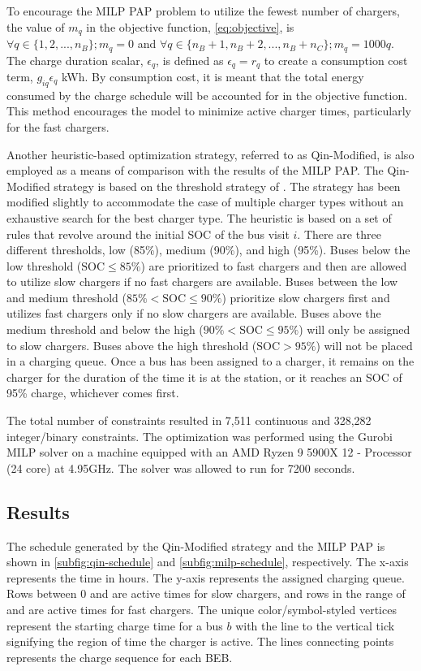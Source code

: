 \documentclass[utf8]{FrontiersinHarvard}
\let\cite\citep                                       %
\newcommand{\fast}{15 }                                                         %
\newcommand{\slow}{15 }                                                         %
\newcommand{\contvars}{7,511 }
\newcommand{\intvars}{328,282 }
\newcommand{\timeran}{7200 }                                                    %
\begin{document}
To encourage the MILP PAP problem to utilize the fewest number of chargers, the value of \(m_q\) in the objective
function, \autoref{eq:objective}, is \(\forall q \in \{1,2,..., n_B \}; m_q = 0\) and \(\forall q \in \{n_B + 1, n_B + 2,..., n_B + n_C \};
m_q = 1000q\). The charge duration scalar, \(\epsilon_q\), is defined as \(\epsilon_q = r_q\) to create a consumption cost term,
\(g_{iq}\epsilon_q\) kWh. By consumption cost, it is meant that the total energy consumed by the charge schedule will be
accounted for in the objective function. This method encourages the model to minimize active charger times, particularly
for the fast chargers.

Another heuristic-based optimization strategy, referred to as Qin-Modified, is also employed as a means of comparison
with the results of the MILP PAP. The Qin-Modified strategy is based on the threshold strategy of
\cite{qin-2016-numer-analy}. The strategy has been modified slightly to accommodate the case of multiple charger types
without an exhaustive search for the best charger type. The heuristic is based on a set of rules that revolve around the
initial SOC of the bus visit \(i\). There are three different thresholds, low (85\%), medium (90\%), and
high (95\%). Buses below the low threshold (\(\text{SOC} \le 85\%\)) are prioritized to fast chargers and then are allowed to
utilize slow chargers if no fast chargers are available. Buses between the low and medium threshold (\(85\% < \text{SOC}
\le 90\%\)) prioritize slow chargers first and utilizes fast chargers only if no slow chargers are available. Buses above
the medium threshold and below the high (\(90\% < \text{SOC} \le 95\%\)) will only be assigned to slow chargers. Buses above
the high threshold (\(\text{SOC} > 95\%\)) will not be placed in a charging queue. Once a bus has been assigned to a
charger, it remains on the charger for the duration of the time it is at the station, or it reaches an SOC of 95\%
charge, whichever comes first.

The total number of constraints resulted in \contvars continuous and \intvars integer/binary constraints. The
optimization was performed using the Gurobi MILP solver \cite{gurobi-2021-gurob-optim} on a machine equipped with an
AMD Ryzen 9 5900X 12 - Processor (24 core) at 4.95GHz. The solver was allowed to run for \timeran seconds.

\subsection{Results}
\label{results}
The schedule generated by the Qin-Modified strategy and the MILP PAP is shown in \autoref{subfig:qin-schedule} and
\autoref{subfig:milp-schedule}, respectively. The x-axis represents the time in hours. The y-axis represents the
assigned charging queue. Rows between 0 and \fpeval{\slow - 1} are active times for slow chargers, and rows in the range
of \fpeval{\slow} and \fpeval{\fast + \slow - 1} are active times for fast chargers. The unique color/symbol-styled
vertices represent the starting charge time for a bus \(b\) with the line to the vertical tick signifying the region of
time the charger is active. The lines connecting points represents the charge sequence for each BEB.
\end{document}

